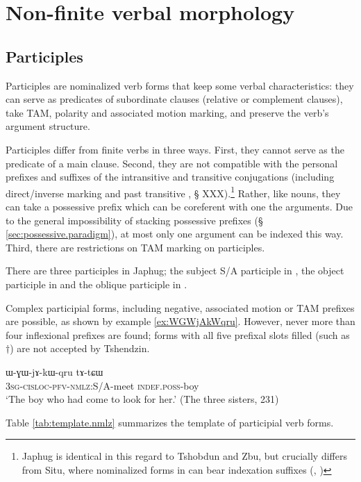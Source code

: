 \chapter{Non-finite verbal morphology}

\section{Participles}
Participles are nominalized verb forms that keep some verbal characteristics: they can serve as predicates of subordinate clauses (relative or complement clauses), take TAM, polarity and associated motion marking, and preserve the verb's argument structure.

Participles differ from finite verbs in three ways. First, they cannot serve as the predicate of a main clause. Second, they are not compatible with the personal prefixes and suffixes of the intransitive and transitive conjugations (including direct/inverse marking and past transitive , § XXX).\footnote{Japhug is identical in this regard to Tshobdun and Zbu, but crucially differs from Situ, where nominalized forms in  can bear indexation suffixes (\citet{jackson06guanxiju}, \citet{jacksonlin07}) } Rather, like nouns, they can take a possessive prefix which can be coreferent with one the arguments. Due to the general impossibility of stacking possessive prefixes (§ \ref{sec:possessive.paradigm}), at most only one argument can be indexed this way. Third, there are restrictions on TAM marking on participles.

There are three participles in Japhug; the subject S/A participle in , the object participle in  and the oblique participle in . 

Complex participial forms, including negative, associated motion or TAM prefixes are possible, as shown by example \ref{ex:WGWjAkWqru}. However, never more than four inflexional prefixes are found; forms with all five prefixal slots filled (such as $\dagger$) are not accepted by Tshendzin.

 \begin{exe}
\ex \label{ex:WGWjAkWqru}
\gll ɯ-ɣɯ-jɤ-kɯ-qru  	tɤ-tɕɯ  	   \\
  \textsc{3sg-cisloc-pfv-nmlz:}S/A-meet \textsc{indef.poss}-boy   \\
\glt `The boy who had come to look for her.' (The three sisters, 231)
 \end{exe}

Table \ref{tab:template.nmlz} summarizes the template of participial verb forms.


